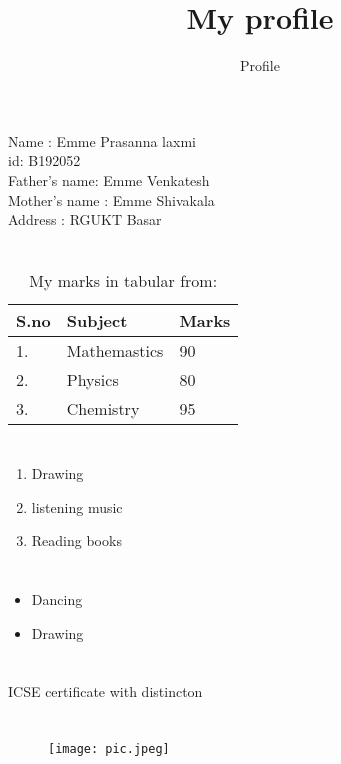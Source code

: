 \documentclass[a4paper,10pt]{article}
\title{My profile}
\author{Profile}
\begin{document}
\maketitle

\section{\color{red}{Introduction about Myself}}

Name : Emme Prasanna laxmi\\
id: B192052\\

Father's name: Emme Venkatesh\\

Mother's name : Emme Shivakala\\

Address : RGUKT Basar\\



\section{\color{purple}{Marks}}
\begin{table}[h]
 \centering
 \caption{My marks in tabular from:}
 \begin{tabular}{|l  |l  |l |}
 \hline
 S.no & Subject & Marks\\
 \hline
  1. & Mathemastics & 90\\
  \hline
  2. & Physics & 80\\
  \hline 
  3. & Chemistry & 95\\
  \hline

 \end{tabular}

\end{table}

\section{\color{yellow}{Hobbies}}
\begin{enumerate}
 \item Drawing \\
 \item listening music \\
\item Reading books\\

\end{enumerate}


\section{\color{pink}{Extra curricular activities}}
\begin{itemize}
 \item Dancing
 \item Drawing
\end{itemize}

\section{\color{red}{Achievements}}
ICSE certificate with distincton

\section{\color{blue}{RGUKT}}
\begin{figure}[h]
 \centering
 \texttt{[image: pic.jpeg]}
\end{figure}
\end{document}
